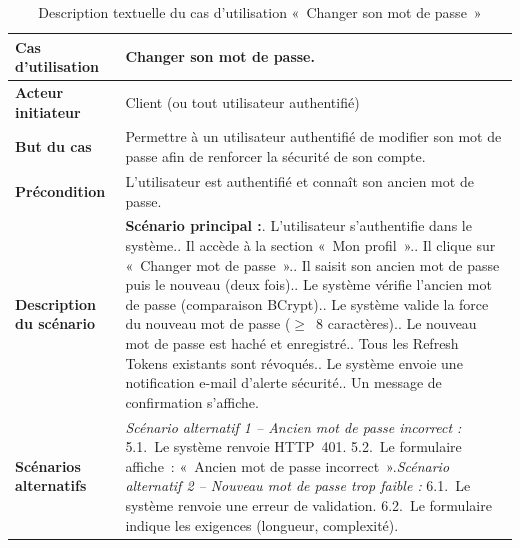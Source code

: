 \begin{table}[H]
  \caption{Description textuelle du cas d'utilisation «~Changer son mot de passe~»}
  \label{tab:cu-changer-mdp}
  \centering
  \begin{tabularx}{\textwidth}{|L{3.8cm}|X|}
    \hline
    \textbf{Cas d'utilisation} & Changer son mot de passe. \\
    \hline
    \textbf{Acteur initiateur} & Client (ou tout utilisateur authentifié) \\
    \hline
    \textbf{But du cas} & Permettre à un utilisateur authentifié de modifier son mot de passe afin de renforcer la sécurité de son compte. \\
    \hline
    \textbf{Précondition} & L'utilisateur est authentifié et connaît son ancien mot de passe. \\
    \hline
    \textbf{Description du scénario} &
    \textbf{Scénario principal :}. L'utilisateur s'authentifie dans le système.. Il accède à la section «~Mon profil~».. Il clique sur «~Changer mot de passe~».. Il saisit son ancien mot de passe puis le nouveau (deux fois).. Le système vérifie l'ancien mot de passe (comparaison BCrypt).. Le système valide la force du nouveau mot de passe ($\geq$~8 caractères).. Le nouveau mot de passe est haché et enregistré.. Tous les Refresh Tokens existants sont révoqués.. Le système envoie une notification e-mail d'alerte sécurité.. Un message de confirmation s'affiche.\\
    \hline
    \textbf{Scénarios alternatifs} &
    \textit{Scénario alternatif 1 -- Ancien mot de passe incorrect :}\newline
    \hspace*{6pt}5.1.~Le système renvoie HTTP~401.\newline
    \hspace*{6pt}5.2.~Le formulaire affiche~: «~Ancien mot de passe incorrect~».\newline[2pt]
    \textit{Scénario alternatif 2 -- Nouveau mot de passe trop faible :}\newline
    \hspace*{6pt}6.1.~Le système renvoie une erreur de validation.\newline
    \hspace*{6pt}6.2.~Le formulaire indique les exigences (longueur, complexité).\\
    \hline
  \end{tabularx}
\end{table}

